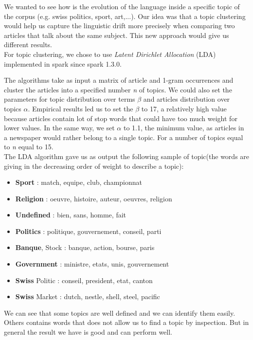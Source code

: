 We wanted to see how is the evolution of the language inside a specific topic of the corpus (e.g. swiss politics, sport, art,...).	
Our idea was that a topic clustering would help us capture the linguistic drift more precisely when comparing two articles that talk about the same subject.
This new approach would give us different results.\\
For topic clustering, we chose to use \emph{Latent Dirichlet Allocation} (LDA) implemented in spark since spark 1.3.0.

The algorithms take as input a matrix of article and 1-gram occurrences and cluster the articles into a specified number \textit{n} of topics. We could also set the parameters for topic distribution over terms $\beta$ and articles distribution over topics $\alpha$. Empirical results led us to set the $\beta$ to 17, a relatively high value because articles contain lot of stop words that could have too much weight for lower values. In the same way, we set $\alpha$ to 1.1, the minimum value, as articles in a newspaper would rather belong to a single topic. For a number of topics equal to \textit{n} equal to 15.\\
The LDA algorithm gave us as output the following sample of topic(the words are giving in the decreasing order of weight to describe a topic):

\begin{itemize}
    \item \textbf{Sport} : match, equipe, club, championnat
    \item \textbf{Religion} : oeuvre, histoire, auteur, oeuvres, religion
    \item \textbf{Undefined} : bien, sans, homme, fait
    \item \textbf{Politics} : politique, gouvernement, conseil, parti
    \item \textbf{Banque}, Stock : banque, action, bourse, paris
    \item \textbf{Government} : ministre, etats, unis, gouvernement
    \item \textbf{Swiss} Politic : conseil, president, etat, canton
    \item \textbf{Swiss} Market : dutch, nestle, shell, steel, pacific
\end{itemize}

We can see that some topics are well defined and we can identify them easily. Others contains words that does not allow us to find a topic by inspection. But in general the result we have is good and can perform well.
